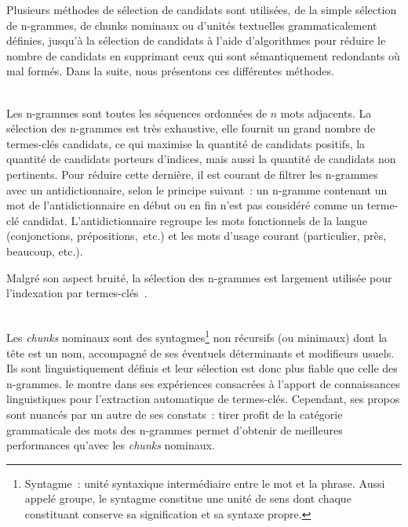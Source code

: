    Plusieurs méthodes de sélection de candidats sont utilisées, de la simple
    sélection de n-grammes, de chunks nominaux ou d'unités textuelles
    grammaticalement définies, jusqu'à la sélection de candidats à l'aide
    d'algorithmes pour réduire le nombre de candidats en supprimant ceux qui
    sont sémantiquement redondants où mal formés. Dans la suite, nous présentons
    ces différentes méthodes.

    ~\\Les n-grammes sont
    toutes les séquences ordonnées de $n$ mots adjacents. La sélection des
    n-grammes est très exhaustive, elle fournit un grand nombre de termes-clés
    candidats, ce qui maximise la quantité de candidats positifs, la quantité de
    candidats porteurs d'indices, mais aussi la quantité de candidats non
    pertinents. Pour réduire cette dernière, il est courant de filtrer les
    n-grammes avec un
    antidictionnaire, selon le principe suivant~: un n-gramme
    contenant un mot de l'antidictionnaire en début ou en fin n'est pas
    considéré comme un terme-clé candidat. L'antidictionnaire regroupe les mots
    fonctionnels de la langue (conjonctions, prépositions,~etc.) et les mots
    d'usage courant (\og{}particulier\fg{}, \og{}près\fg{}, \og{}beaucoup\fg{},
    etc.).
    
    Malgré son aspect bruité, la sélection des n-grammes est largement utilisée
    pour l'indexation par
    termes-clés~\cite{witten1999kea,hulth2003keywordextraction,medelyan2009humancompetitivetagging}.

    \begin{example}
    \end{example}

    ~\\Les \textit{chunks} nominaux
    sont des syntagmes\footnote{Syntagme~: unité syntaxique
    intermédiaire entre le mot et la phrase. Aussi appelé groupe, le syntagme
    constitue une unité de sens dont chaque constituant conserve sa
    signification et sa syntaxe propre.} non récursifs (ou minimaux) dont la
    tête est un nom, accompagné de ses éventuels déterminants et modifieurs
    usuels. Ils sont linguistiquement définis et leur sélection est donc plus
    fiable que celle des n-grammes.  le
    montre dans ses expériences consacrées à l'apport de connaissances
    linguistiques pour l'extraction automatique de termes-clés. Cependant, ses
    propos sont nuancés par un autre de ses constats~: tirer profit de la
    catégorie grammaticale des mots des n-grammes permet d'obtenir de meilleures
    performances qu'avec les \textit{chunks} nominaux.

